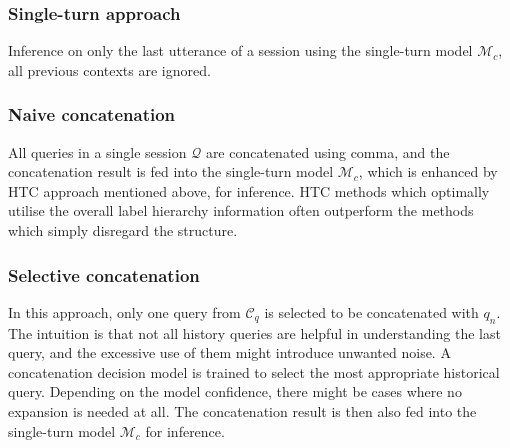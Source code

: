 \subsubsection{Single-turn approach}
Inference on only the last utterance of a session using the single-turn model $\mathcal{M}_c$, all previous contexts are ignored.
\subsubsection{Naive concatenation}
All queries in a single session $\mathcal{Q}$ are concatenated using comma, and the concatenation result is fed into the single-turn model $\mathcal{M}_c$, which is enhanced by HTC approach mentioned above, for inference. HTC methods which optimally utilise the overall label hierarchy information often outperform the methods which simply disregard the structure\cite{Rojas2020EfficientSF}. 
\subsubsection{Selective concatenation}
In this approach, only one query from $\mathcal{C}_q$ is selected to be concatenated with $q_n$. The intuition is that not all history queries are helpful in understanding the last query, and the excessive use of them might introduce unwanted noise. A concatenation decision model is trained to select the most appropriate historical query. Depending on the model confidence, there might be cases where no expansion is needed at all. The concatenation result is then also fed into the single-turn model $\mathcal{M}_c$ for inference.







